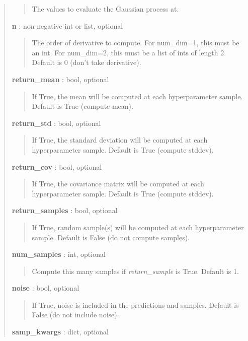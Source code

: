 \documentclass[letterpaper,10pt,english]{sphinxmanual}
\begin{document}
\begin{fulllineitems}
\begin{fulllineitems}
\begin{quote}
\begin{description}
\begin{quote}
The values to evaluate the Gaussian process at.
\end{quote}

\textbf{n} : non-negative int or list, optional
\begin{quote}

The order of derivative to compute. For num\_dim=1, this must be an
int. For num\_dim=2, this must be a list of ints of length 2.
Default is 0 (don't take derivative).
\end{quote}

\textbf{return\_mean} : bool, optional
\begin{quote}

If True, the mean will be computed at each hyperparameter sample.
Default is True (compute mean).
\end{quote}

\textbf{return\_std} : bool, optional
\begin{quote}

If True, the standard deviation will be computed at each
hyperparameter sample. Default is True (compute stddev).
\end{quote}

\textbf{return\_cov} : bool, optional
\begin{quote}

If True, the covariance matrix will be computed at each
hyperparameter sample. Default is True (compute stddev).
\end{quote}

\textbf{return\_samples} : bool, optional
\begin{quote}

If True, random sample(s) will be computed at each hyperparameter
sample. Default is False (do not compute samples).
\end{quote}

\textbf{num\_samples} : int, optional
\begin{quote}

Compute this many samples if \emph{return\_sample} is True. Default is 1.
\end{quote}

\textbf{noise} : bool, optional
\begin{quote}

If True, noise is included in the predictions and samples. Default
is False (do not include noise).
\end{quote}

\textbf{samp\_kwargs} : dict, optional
\begin{quote}


\end{quote}
\end{description}
\end{quote}
\end{fulllineitems}
\end{fulllineitems}
\end{document}
